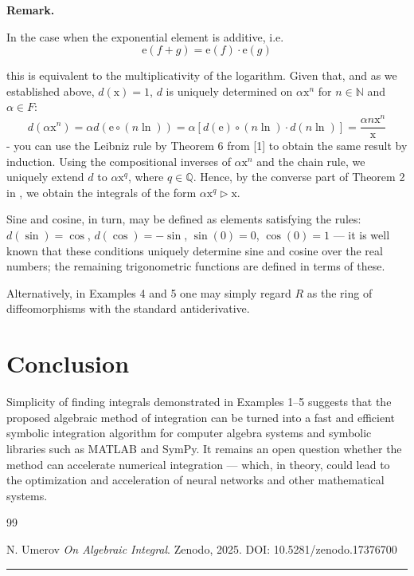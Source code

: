 \documentclass[12pt]{article}
\theoremstyle{definition}
\begin{document}
\vspace{10pt}
\noindent\textbf{Remark.} 

\noindent In the case when the exponential element is additive, i.e. 
\[
\mathrm{e}(f+g) = \mathrm{e}(f) \cdot \mathrm{e}(g)
\]

this is equivalent to the multiplicativity of the logarithm. Given that, and as we established above,
 $d(\mathrm{x}) = 1$, $d$ is uniquely determined on $\alpha \mathrm{x}^n$ for $n \in \mathbb{N}$ and $\alpha \in F$:
 \[
 d(\alpha \mathrm{x}^n) = \alpha d(\mathrm{e} \circ (n \ln)) = \alpha [d(\mathrm{e}) \circ (n \ln) \cdot d(n \ln)] = \frac{\alpha n \mathrm{x}^n}{\mathrm{x}} 
 \]
- you can use the Leibniz rule by Theorem 6 from [1] to obtain the same result by induction. 
Using the compositional inverses of $\alpha \mathrm{x}^n$ and the chain rule, 
we uniquely extend $d$ to $\alpha \mathrm{x}^q$, where $q \in \mathbb{Q}$.
Hence, by the converse part of Theorem 2 in \cite{umerov2025}, 
we obtain the integrals of the form $\alpha \mathrm{x}^q \triangleright \mathrm{x}$.

 Sine and cosine, in turn, may be defined as elements satisfying the rules: 
$d(\sin) = \cos$, $d(\cos) = -\sin$, $\sin(0)=0$, $\cos(0)=1$ 
--- it is well known that these conditions uniquely determine sine and cosine over the real numbers; 
the remaining trigonometric functions are defined in terms of these.

Alternatively, in Examples 4 and 5 one may simply regard $R$ as the ring of diffeomorphisms 
with the standard antiderivative.


\section*{Conclusion}

Simplicity of finding integrals demonstrated in Examples 1–5 suggests that the 
proposed algebraic method of integration can be turned into a fast and efficient symbolic 
integration algorithm for computer algebra systems and symbolic libraries such as MATLAB and SymPy. 
It remains an open question whether the method can accelerate numerical integration — which, in theory, 
could lead to the optimization and acceleration of neural networks and other mathematical systems.


\begin{thebibliography}{99}

N. Umerov
\textit{On Algebraic Integral}.
Zenodo, 2025.
DOI: 10.5281/zenodo.17376700

\end{thebibliography}

\vspace{10pt}
\begin{center}
\rule{7cm}{7cm}
\end{center}
\end{document}
